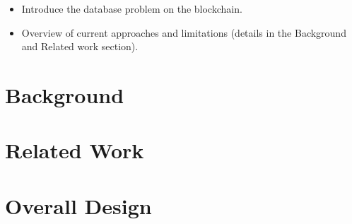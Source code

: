 \documentclass[a4paper]{article}
\begin{document}
    \begin{itemize}
        \item Introduce the database problem on the blockchain.
        \item Overview of current approaches and limitations (details in the Background and Related work section).
    \end{itemize}
%
%
%

\section{Background}
\section{Related Work}
\section{Overall Design}
\end{document}
